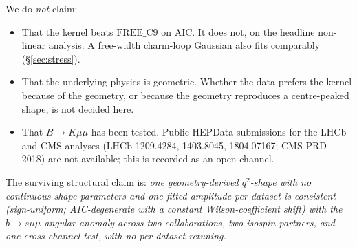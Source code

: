 We do \emph{not} claim:
\begin{itemize}
\item That the kernel beats $\mathrm{FREE\_C9}$ on AIC. It does not,
  on the headline non-linear analysis. A free-width charm-loop
  Gaussian also fits comparably (\S\ref{sec:stress}).
\item That the underlying physics is geometric. Whether the data
  prefers the kernel because of the geometry, or because the
  geometry reproduces a centre-peaked shape, is not decided here.
\item That $B \to K\mu\mu$ has been tested. Public HEPData
  submissions for the LHCb and CMS analyses
  (LHCb 1209.4284, 1403.8045, 1804.07167; CMS PRD 2018) are not
  available; this is recorded as an open channel.
\end{itemize}

The surviving structural claim is: \emph{one geometry-derived
$q^{2}$-shape with no continuous shape parameters and one fitted
amplitude per dataset is consistent (sign-uniform; AIC-degenerate
with a constant Wilson-coefficient shift) with the $b\to s\mu\mu$
angular anomaly across two collaborations, two isospin partners,
and one cross-channel test, with no per-dataset retuning.}
